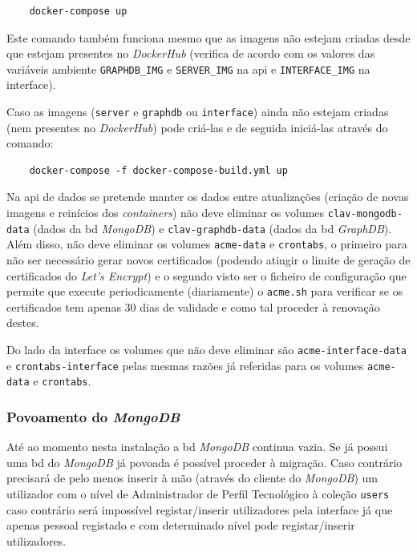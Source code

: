 \footnotesize
\begin{verbatim}
    docker-compose up
\end{verbatim}
\normalsize

Este comando também funciona mesmo que as imagens não estejam criadas desde que estejam presentes no \textit{DockerHub} (verifica de acordo com os valores das variáveis ambiente \texttt{GRAPHDB\_IMG} e \texttt{SERVER\_IMG} na \acrshort{api} e \texttt{INTERFACE\_IMG} na interface).

Caso as imagens (\texttt{server} e \texttt{graphdb} ou \texttt{interface}) ainda não estejam criadas (nem presentes no \textit{DockerHub}) pode criá-las e de seguida iniciá-las através do comando:

\footnotesize
\begin{verbatim}
    docker-compose -f docker-compose-build.yml up
\end{verbatim}
\normalsize

Na \acrshort{api} de dados se pretende manter os dados entre atualizações (criação de novas imagens e reinícios dos \textit{containers}) não deve eliminar os volumes \texttt{clav-mongodb-data} (dados da \acrshort{bd} \textit{MongoDB}) e \texttt{clav-graphdb-data} (dados da \acrshort{bd} \textit{GraphDB}). Além disso, não deve eliminar os volumes \texttt{acme-data} e \texttt{crontabs}, o primeiro para não ser necessário gerar novos certificados (podendo atingir o limite de geração de certificados do \textit{Let's Encrypt}) e o segundo visto ser o ficheiro de configuração que permite que execute periodicamente (diariamente) o \texttt{acme.sh} para verificar se os certificados tem apenas 30 dias de validade e como tal proceder à renovação destes.

Do lado da interface os volumes que não deve eliminar são \texttt{acme-interface-data} e \texttt{crontabs-interface} pelas mesmas razões já referidas para os volumes \texttt{acme-data} e \texttt{crontabs}. 

\subsubsection{Povoamento do \textit{MongoDB}}\label{sec:inst-povMDB}
Até ao momento nesta instalação a \acrshort{bd} \textit{MongoDB} continua vazia. Se já possui uma \acrshort{bd} do \textit{MongoDB} já povoada é possível proceder à migração. Caso contrário precisará de pelo menos inserir à mão (através do cliente do \textit{MongoDB}) um utilizador com o nível de Administrador de Perfil Tecnológico à coleção \texttt{users} caso contrário será impossível registar/inserir utilizadores pela interface já que apenas pessoal registado e com determinado nível pode registar/inserir utilizadores.

